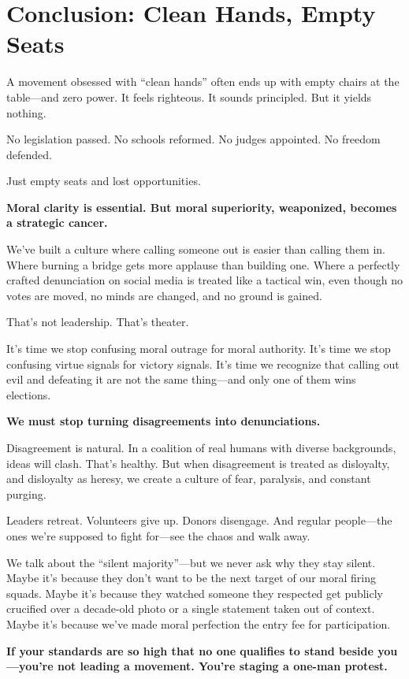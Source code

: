 


\section{Conclusion: Clean Hands, Empty Seats}

A movement obsessed with ``clean hands'' often ends up with empty chairs at the table—and zero power. It feels righteous. It sounds principled. But it yields nothing.

No legislation passed. No schools reformed. No judges appointed. No freedom defended.

Just empty seats and lost opportunities.

\textbf{Moral clarity is essential. But moral superiority, weaponized, becomes a strategic cancer.}

We’ve built a culture where calling someone out is easier than calling them in. Where burning a bridge gets more applause than building one. Where a perfectly crafted denunciation on social media is treated like a tactical win, even though no votes are moved, no minds are changed, and no ground is gained.

That’s not leadership. That’s theater.

It’s time we stop confusing moral outrage for moral authority. It’s time we stop confusing virtue signals for victory signals. It’s time we recognize that calling out evil and defeating it are not the same thing—and only one of them wins elections.

\textbf{We must stop turning disagreements into denunciations.}

Disagreement is natural. In a coalition of real humans with diverse backgrounds, ideas will clash. That’s healthy. But when disagreement is treated as disloyalty, and disloyalty as heresy, we create a culture of fear, paralysis, and constant purging.

Leaders retreat. Volunteers give up. Donors disengage. And regular people—the ones we’re supposed to fight for—see the chaos and walk away.

We talk about the ``silent majority''—but we never ask why they stay silent. Maybe it’s because they don’t want to be the next target of our moral firing squads. Maybe it's because they watched someone they respected get publicly crucified over a decade-old photo or a single statement taken out of context. Maybe it's because we’ve made moral perfection the entry fee for participation.

\textbf{If your standards are so high that no one qualifies to stand beside you—you're not leading a movement. You're staging a one-man protest.}


